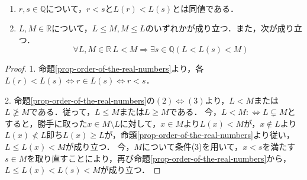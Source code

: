\documentclass[uplatex,dvipdfmx]{jsreport}
\begin{document}
\begin{corollary}[実数体の順序]\label{corollary-order-of-the-real-numbers}　
    \begin{enumerate}
        \item $r,s\in\mathbb{Q}$について，$r<s$と$L(r)<L(s)$とは同値である．
        \item $L,M\in\mathbb{R}$について，$L\leq M, M\leq L$のいずれかが成り立つ．また，次が成り立つ．
        \[ \forall L,M\in\mathbb{R} \, L<M \Longrightarrow \exists s\in\mathbb{Q} (L<L(s)<M) \]
    \end{enumerate}
\end{corollary}
\begin{proof}
    1. 命題\ref{prop-order-of-the-real-numbers}より，各$L(r)<L(s)\Leftrightarrow r\in L(s)\Leftrightarrow r<s$．

    2. 命題\ref{prop-order-of-the-real-numbers}の$(2)\Leftrightarrow(3)$より，$L<M$または$L\ngeq M$である．従って，$L\le M$または$L\ge M$である．
    今，$L<M:\Leftrightarrow L\subsetneq M$とすると，勝手に取った$x\in M\setminus L$に対して，$x\in M$より$L(x)<M$が，$x\notin L$より$L(x)\nless L$即ち$L(x)\ge L$が，命題\ref{prop-order-of-the-real-numbers}より従い，$L\le L(x)<M$が成り立つ．
    今，$M$について条件(3)を用いて，$x<s$を満たす$s\in M$を取り直すことにより，再び命題\ref{prop-order-of-the-real-numbers}から，$L\le L(x)<L(s)<M$が成り立つ．
\end{proof}
\end{document}
